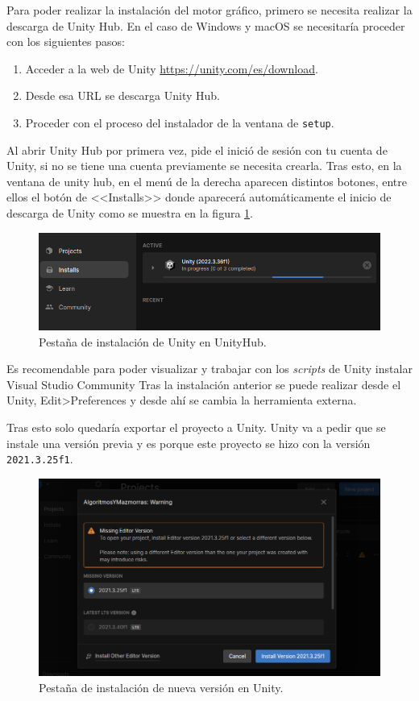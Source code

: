 Para poder realizar la instalación del motor gráfico, primero se necesita realizar la descarga de Unity Hub. En el caso de Windows y macOS se necesitaría proceder con los siguientes pasos:
\begin{enumerate}
    \item Acceder a la web de Unity \url{https://unity.com/es/download}.
    \item Desde esa URL se descarga Unity Hub.
    \item Proceder con el proceso del instalador de la ventana de \texttt{setup}.
\end{enumerate}

Al abrir Unity Hub por primera vez, pide el inició de sesión con tu cuenta de Unity, si no se tiene una cuenta previamente se necesita crearla.
Tras esto, en la ventana de unity hub, en el menú de la derecha aparecen distintos botones, entre ellos el botón de <<Installs>> donde aparecerá automáticamente el inicio de descarga de Unity como se muestra en la figura \ref{fig:InstallsUnity}.

\begin{figure}[!h]  
    \centering  
    \includegraphics[width=\textwidth]{img/InstallsUnity.png}  
    \caption{Pestaña de instalación de Unity en UnityHub.}  
    \label{fig:InstallsUnity}
\end{figure}

Es recomendable para poder visualizar y trabajar con los \textit{scripts} de Unity instalar Visual Studio Community
Tras la instalación anterior se puede realizar desde el Unity, Edit>Preferences y desde ahí se cambia la herramienta externa.

Tras esto solo quedaría exportar el proyecto a Unity. Unity va a pedir que se instale una versión previa y es porque este proyecto se hizo con la versión \texttt{2021.3.25f1}. 
\begin{figure}[!h]  
    \centering  
    \includegraphics[width=\textwidth]{img/UnityInstallVersion.png}  
    \caption{Pestaña de instalación de nueva versión en Unity.}  
    \label{fig:UnityInstallVersion}
\end{figure}

